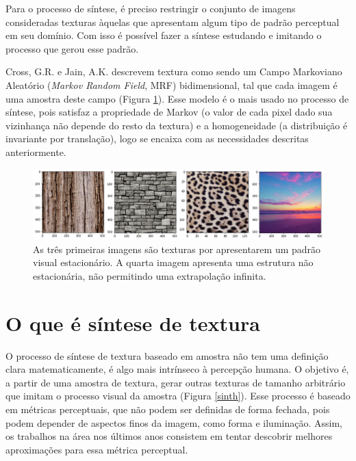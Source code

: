 
Para o processo de síntese, é preciso restringir o
conjunto de imagens consideradas texturas àquelas
que apresentam algum tipo de padrão perceptual
em seu domínio. Com isso é possível fazer a síntese
estudando e imitando o processo que gerou esse padrão.


Cross, G.R. e Jain, A.K. \cite{Cross1983} descrevem
textura como sendo um Campo Markoviano Aleatório
(\textit{Markov Random Field}, MRF) bidimensional,
tal que cada imagem é uma amostra deste campo (Figura \ref{texture}).
Esse modelo é o mais usado no processo de síntese, 
pois satisfaz a propriedade de Markov 
(o valor de cada pixel dado sua vizinhança não
depende do resto da textura) e a homogeneidade (a
distribuição é invariante por translação), logo
se encaixa com as necessidades descritas anteriormente.

\begin{figure}[!ht]
	\includegraphics[width=\linewidth]{files/assets/texture.png}
	\caption{As três primeiras imagens são texturas por apresentarem
	um padrão visual estacionário. A quarta imagem apresenta
    uma estrutura não estacionária, não permitindo uma extrapolação
	infinita.}
	\label{texture}
\end{figure}


 

\section{O que é síntese de textura}


O processo de síntese de textura baseado
em amostra não tem uma definição clara
matematicamente, é algo mais intrínseco
à percepção humana. O objetivo é,
a partir de uma amostra de textura,
gerar outras texturas de tamanho
arbitrário que imitam o processo
visual da amostra (Figura \ref{sinth}). Esse processo
é baseado em métricas
perceptuais, que não podem ser
definidas de forma fechada, pois
podem depender de aspectos
finos da imagem, como forma e 
iluminação.
Assim, os trabalhos na área
nos últimos anos consistem em
tentar descobrir melhores aproximações
para essa métrica perceptual.


